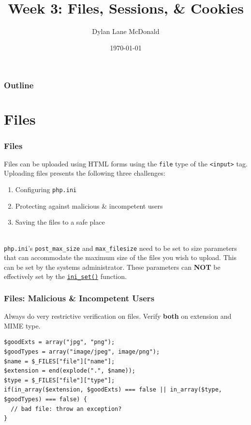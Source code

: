 \documentclass[aspectratio=169]{beamer}
\title{Week 3: Files, Sessions, \& Cookies}
\author{Dylan Lane McDonald}
\institute{CNM STEMulus Center\\Web Development with PHP}
\date{\today}
\begin{document}
\lstset{language=PHP}
\begin{frame}
\titlepage
\end{frame}

\begin{frame}
\frametitle{Outline}
\tableofcontents
\end{frame}

\section{Files}
\begin{frame}
\frametitle{Files}
Files can be uploaded using HTML forms using the \texttt{file} type of the \texttt{<input>} tag. Uploading files presents the following three challenges:
\begin{enumerate}
	\item Configuring \texttt{php.ini}
	\item Protecting against malicious \& incompetent users
	\item Saving the files to a safe place
\end{enumerate}
\pause
\mbox{}\\
\texttt{php.ini}'s \texttt{post\_max\_size} and \texttt{max\_filesize} need to be set to size parameters that can accommodate the maximum size of the files you wish to upload. This can be set by the systems administrator. These parameters can \textbf{NOT} be effectively set by the \href{http://us.php.net/manual/en/function.ini-set.php}{\texttt{ini\_set()}} function.
\end{frame}

\begin{frame}[fragile]
\frametitle{Files: Malicious \& Incompetent Users}
Always do very restrictive verification on files. Verify \textbf{both} on extension and MIME type.
\begin{lstlisting}[caption=Verifying a File,label=code:file-verify]
$goodExts = array("jpg", "png");
$goodTypes = array("image/jpeg", image/png");
$name = $_FILES["file"]["name"];
$extension = end(explode(".", $name));
$type = $_FILES["file"]["type"];
if(in_array($extension, $goodExts) === false || in_array($type, $goodTypes) === false) {
  // bad file: throw an exception?
}
\end{lstlisting}
\end{frame}
\end{document}
